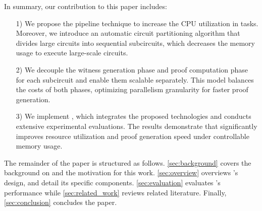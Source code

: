 In summary, our contribution to this paper includes:
\begin{itemize}[leftmargin=*]
    \item[1)]  We propose the pipeline technique to increase the CPU utilization in \system tasks. Moreover, we introduce an automatic circuit partitioning algorithm that divides large circuits into sequential subcircuits, which decreases the memory usage to execute large-scale circuits. 
    \item[2)]    We decouple the witness generation phase and proof computation phase for each subcircuit and enable them scalable separately. This model balances the costs of both phases,  optimizing parallelism granularity for faster proof generation.
    \item[3)] We implement \emph{\system}, which integrates the proposed technologies and conducts extensive experimental evaluations. The results demonstrate that \system significantly improves resource utilization and proof generation speed under controllable memory usage.
\end{itemize}



The remainder of the paper is structured as follows. \cref{sec:background} covers the background on \zk and the motivation for this work. \cref{sec:overview} overviews {\system}'s design, and  detail its specific components.  \cref{sec:evaluation} evaluates \system's performance  while \cref{sec:related_work} reviews related literature. Finally, \cref{sec:conclusion} concludes the paper.